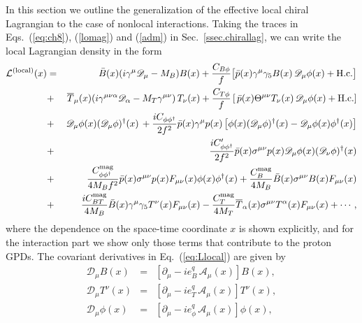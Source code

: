 \documentclass[preprintnumbers,prd,superscriptaddress,preprint]{revtex4-1}
\begin{document}
In this section we outline the generalization of the effective local chiral Lagrangian to the case of nonlocal interactions.
Taking the traces in Eqs.~(\ref{eq:ch8}), (\ref{lomag}) and (\ref{adm}) in Sec.~\ref{ssec.chirallag}, we can write the local Lagrangian density in the form
%
\begin{eqnarray}
{\cal L}^{\rm (local)}(x)
&=&\bar B(x)(i \gamma^\mu \mathscr{D}_{\mu} - M_B) B(x)
 + \frac{C_{B\phi}}{f}
   \big[ \bar{p}(x) \gamma^\mu \gamma_5 B(x)\,
	  \mathscr{D}_{\mu} \phi(x) + {\rm H.c.}
   \big]						\notag\\
&+&\overline{T}_\mu(x)
   (i \gamma^{\mu\nu\alpha} \mathscr{D}_{\alpha} - M_T \gamma^{\mu\nu})\,
   T_\nu(x)
 + \frac{C_{T\phi}}{f}
   \left[\, \bar{p}(x) \Theta^{\mu\nu} T_\nu(x)\,
	 \mathscr{D}_{\mu} \phi(x) + {\rm H.c.}
   \right]						\notag\\
&+&\mathscr{D}_{\mu} \phi(x) (\mathscr{D}_{\mu} \phi)^\dag(x)\,
 + \frac{i C_{\phi\phi^\dag}}{2 f^2}
   \bar p(x) \gamma^\mu p(x)
   \left[ \phi(x) (\mathscr{D}_\mu \phi)^\dag(x)
	- \mathscr{D}_{\mu} \phi(x) \phi^\dag(x)
   \right]
\notag\\
&+&\frac{i C_{\phi\phi^\dag}'}{2 f^2}
   \bar p(x) \sigma^{\mu\nu} p(x)\mathscr{D}_\mu \phi(x)
    (\mathscr{D}_{\nu} \phi)^\dag(x)
\notag\\
&+&\frac{C_{\phi\phi^\dag}^{\rm mag}}{4 M_B f^2}
   \bar p(x) \sigma^{\mu\nu} p(x) F_{\mu\nu}(x) \phi(x)\phi^\dag(x)
 + \frac{C_{B}^{\rm mag}}{4 M_B}
   \bar B(x) \sigma^{\mu\nu} B(x) F_{\mu\nu}(x) 
\notag\\
&+&\frac{i C_{BT}^{\rm mag}}{4 M_B}
   \bar B(x) \gamma^\mu\gamma_5 T^\nu (x) F_{\mu\nu}(x)		
 - \frac{C_{T}^{\rm mag}}{4 M_T}
   \overline T_\alpha(x) \sigma^{\mu\nu} T^\alpha(x) F_{\mu\nu}(x)	
 + \cdots ,
\label{eq:Llocal}
\end{eqnarray}
%
where the dependence on the space-time coordinate $x$ is shown explicitly, and for the interaction part we show only those terms that contribute to the proton GPDs.
The covariant derivatives in Eq.~(\ref{eq:Llocal}) are given by
%
\begin{subequations}
\begin{eqnarray}
\mathscr{D}_{\mu} B(x)
&=& \left[ \partial_\mu - i e^q_B\, \mathscr{A_\mu}(x)
    \right] B(x),
\\
\mathscr{D}_{\mu} T^\nu(x)
&=& \left[ \partial_\mu - i e^q_T\, \mathscr{A_\mu}(x)
    \right] T^\nu(x),
\\
\mathscr{D}_{\mu} \phi(x)
&=& \left[ \partial_\mu - i e^q_\phi\, \mathscr{A_\mu}(x)
    \right] \phi(x),
\end{eqnarray}
\end{subequations}
\end{document}

